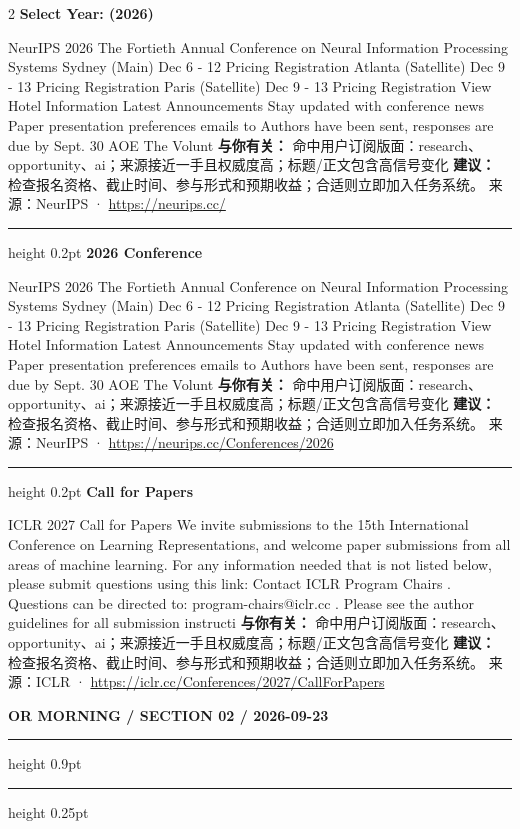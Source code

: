 \documentclass[10.5pt]{ctexart}
\begin{document}
\begin{multicols}{2}
\vspace{2mm}
{\large\bfseries Select Year: (2026)}\par
NeurIPS 2026 The Fortieth Annual Conference on Neural Information Processing Systems Sydney (Main) Dec 6 - 12 Pricing Registration Atlanta (Satellite) Dec 9 - 13 Pricing Registration Paris (Satellite) Dec 9 - 13 Pricing Registration View Hotel Information Latest Announcements Stay updated with conference news Paper presentation preferences emails to Authors have been sent, responses are due by Sept. 30 AOE The Volunt
\textbf{与你有关：} 命中用户订阅版面：research、opportunity、ai；来源接近一手且权威度高；标题/正文包含高信号变化
\textbf{建议：} 检查报名资格、截止时间、参与形式和预期收益；合适则立即加入任务系统。
{\footnotesize\color{ormuted} 来源：NeurIPS · \url{https://neurips.cc/}}
\vspace{2mm}
\hrule height 0.2pt
\vspace{2mm}
{\large\bfseries 2026 Conference}\par
NeurIPS 2026 The Fortieth Annual Conference on Neural Information Processing Systems Sydney (Main) Dec 6 - 12 Pricing Registration Atlanta (Satellite) Dec 9 - 13 Pricing Registration Paris (Satellite) Dec 9 - 13 Pricing Registration View Hotel Information Latest Announcements Stay updated with conference news Paper presentation preferences emails to Authors have been sent, responses are due by Sept. 30 AOE The Volunt
\textbf{与你有关：} 命中用户订阅版面：research、opportunity、ai；来源接近一手且权威度高；标题/正文包含高信号变化
\textbf{建议：} 检查报名资格、截止时间、参与形式和预期收益；合适则立即加入任务系统。
{\footnotesize\color{ormuted} 来源：NeurIPS · \url{https://neurips.cc/Conferences/2026}}
\vspace{2mm}
\hrule height 0.2pt
\vspace{2mm}
{\large\bfseries Call for Papers}\par
ICLR 2027 Call for Papers We invite submissions to the 15th International Conference on Learning Representations, and welcome paper submissions from all areas of machine learning. For any information needed that is not listed below, please submit questions using this link: Contact ICLR Program Chairs . Questions can be directed to: program-chairs@iclr.cc . Please see the author guidelines for all submission instructi
\textbf{与你有关：} 命中用户订阅版面：research、opportunity、ai；来源接近一手且权威度高；标题/正文包含高信号变化
\textbf{建议：} 检查报名资格、截止时间、参与形式和预期收益；合适则立即加入任务系统。
{\footnotesize\color{ormuted} 来源：ICLR · \url{https://iclr.cc/Conferences/2027/CallForPapers}}
\end{multicols}
\newpage
{\small\bfseries OR MORNING / SECTION 02 / 2026-09-23}
\vspace{2mm}
\hrule height 0.9pt
\vspace{1.5mm}
\hrule height 0.25pt
\vspace{4mm}
\end{document}
